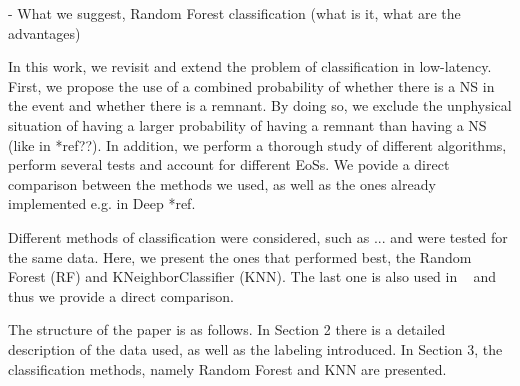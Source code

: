 - What we suggest, Random Forest classification (what is it, what are the advantages)

In this work, we revisit and extend the problem of classification in low-latency. First, we propose the use of a combined probability of whether there is a NS in the event and whether there is a remnant. By doing so, we exclude the unphysical situation of having a larger probability of having a remnant than having a NS (like in *ref??). In addition, we perform a thorough study of different algorithms, perform several tests and account for different EoSs. We povide a direct comparison between the methods we used, as well as the ones already implemented e.g. in Deep *ref. 

Different methods of classification were considered, such as ... and were tested for the same data. Here, we present the ones that performed best, the Random Forest (RF) and KNeighborClassifier (KNN). The last one is also used in ~\cite{Chatterjee:2019avs} and thus we provide a direct comparison. 

The structure of the paper is as follows. In Section 2 there is a detailed description of the data used, as well as the labeling introduced. In Section 3, the classification methods, namely Random Forest and KNN are presented. 
